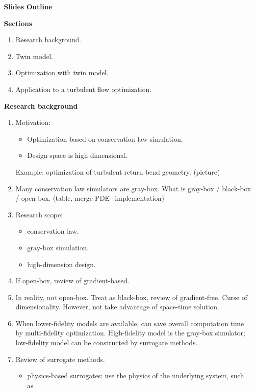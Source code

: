 \documentclass[a4paper,onecolumn]{article}
\theoremstyle{remark}
\begin{document}
\setcounter{page}{1}
\hspace{.36\textwidth}
\Large\textbf{Slides Outline}\\
\normalsize

\textbf{Sections}
\begin{enumerate}
    \item Research background.
    \item Twin model.
    \item Optimization with twin model.
    \item Application to a turbulent flow optimization.
\end{enumerate}

\newpage
\textbf{Research background}
\begin{enumerate}
    \item Motivation: 
          \begin{itemize}
              \item Optimization based on conservation law simulation. 
              \item Design space is high dimensional.
          \end{itemize}
          Example: optimization of turbulent return bend geometry. (picture)
    \item Many conservation law simulators are gray-box. What is gray-box / black-box / open-box. (table, merge PDE+implementation)
    \item Research scope:
          \begin{itemize}
              \item conservation law.
              \item gray-box simulation.
              \item high-dimension design.
          \end{itemize}
    \item If open-box, review of gradient-based.
    \item In reality, not open-box. Treat as black-box, review of gradient-free. Curse of dimensionality.
          However, not take advantage of space-time solution.
    \item When lower-fidelity models are available, can save overall computation time by multi-fidelity optimization.
          High-fidelity model is the gray-box simulator; low-fidelity model can be constructed by surrogate methods.
    \item Review of surrogate methods. 
          \begin{itemize}
              \item physics-based surrogates: use the physics of the underlying system, such as

\end{itemize}
\end{enumerate}
\end{document}
